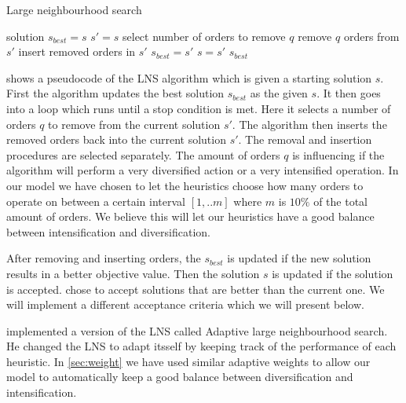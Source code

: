 \documentclass[../main.tex]{subfiles}
\begin{document}
\begin{algorithm}
    \caption{Large neighbourhood search}\label{alg:lns}
    \begin{algorithmic}[1]
        \State solution $s_{best} = s$
        \Repeat
            \State $s' = s$
            \State select number of orders to remove $q$
            \State remove $q$ orders from $s'$
            \State insert removed orders in $s'$
                \State $s_{best}=s'$
            \EndIf
                \State $s = s'$
            \EndIf
        \State
        \Return $s_{best}$
        \EndFunction
    \end{algorithmic}
\end{algorithm}

 shows a pseudocode of the LNS algorithm which is given a starting solution $s$. 
First the algorithm updates the best solution $s_{best}$ as the given $s$.
It then goes into a loop which runs until a stop condition is met.
Here it selects a number of orders $q$ to remove from the current solution $s'$.
The algorithm then inserts the removed orders back into the current solution $s'$. The removal and insertion procedures are selected separately. The amount of orders $q$ is influencing if the algorithm will perform a very diversified action or a very intensified operation.
In our model we have chosen to let the  heuristics choose how many orders to operate on between a certain interval $[1,..m]$ where $m$ is $10\%$ of the total amount of orders. 
We believe this will let our heuristics have a good balance between intensification and diversification. \par

After removing and inserting orders, the $s_{best}$ is updated if the new solution results in a better objective value. 
Then the solution $s$ is updated if the solution is accepted. 
\cite{shaw97} chose to accept solutions that are better than the current one. We will implement a different acceptance criteria which we will present below. \par

\cite{ropke06} implemented a version of the LNS called Adaptive large neighbourhood search. He changed the LNS to adapt itsself by keeping track of the performance of each heuristic. 
In \cref{sec:weight} we have used similar adaptive weights to allow our model to automatically keep a good balance between diversification and intensification. \par
\end{document}
